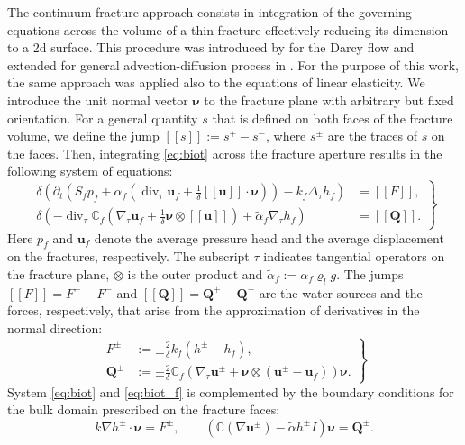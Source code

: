 \documentclass{article}
\newcommand{\CC}{\mathbb C}
\renewcommand{\div}{\operatorname{div}}
\newcommand{\eq}[1]{\begin{equation}#1\end{equation}}
\newcommand{\jmp}[1]{[\![#1]\!]}
\newcommand{\uu}{\vc u}
\newcommand{\vc}[1]{\boldsymbol{#1}}
\begin{document}
The continuum-fracture approach consists in integration of the governing equations across the volume of a thin fracture effectively reducing its dimension to a 2d surface. This procedure was introduced by \cite{martin_modeling_2005} for the Darcy flow and extended for general advection-diffusion process in \cite{brezina_analysis_2015}. For the purpose of this work, the same approach was applied also to the equations of linear elasticity. We introduce the unit normal vector $\vc\nu$ to the fracture plane with arbitrary but fixed orientation.
For a general quantity $s$ that is defined on both faces of the fracture volume, we define the jump $\jmp{s}:=s^+-s^-$, where $s^\pm$ are the traces of $s$ on the faces. 
Then, integrating \eqref{eq:biot} across the fracture aperture results in the following system of equations:
\eq{\label{eq:biot_f}\left.\begin{aligned}
\delta\left(\partial_t\left(S_fp_f + \alpha_f\left(\div_\tau\uu_f+\tfrac1\delta\jmp{\uu}\cdot\vc\nu\right)\right) - k_f\Delta_\tau h_f\right) &= \jmp{F}, \\
\delta\left(-\div_\tau\CC_f(\nabla_\tau\uu_f+\tfrac1\delta\vc\nu\otimes\jmp{\uu}) + \tilde\alpha_f\nabla_\tau h_f\right) &= \jmp{\vc Q}.
\end{aligned}\right\} }
Here $p_f$ and $\uu_f$ denote the average pressure head and the average displacement on the fractures, respectively. The subscript $\tau$ indicates tangential operators on the fracture plane, $\otimes$ is the outer product and $\tilde\alpha_f:=\alpha_f\varrho_l g$.
The jumps $\jmp{F}=F^+-F^-$ and $\jmp{\vc Q}=\vc Q^+-\vc Q^-$ are the water sources and the forces, respectively,  that arise from the approximation of derivatives in the normal direction:
\eq{ 
\label{eq:fr_coupling}
\left.\begin{aligned}
F^\pm &:= \pm\frac2\delta k_f(h^\pm-h_f),\\
\vc Q^\pm &:= \pm\frac2\delta\CC_f(\nabla_\tau\uu^\pm + \vc\nu\otimes(\uu^\pm-\uu_f))\vc\nu. %
\end{aligned}\right\} 
}
System \eqref{eq:biot} and \eqref{eq:biot_f} is complemented by the boundary conditions for the bulk domain prescribed on the fracture faces:
\eq{ 
\label{eq:fr_coupling_bulk}
k\nabla h^\pm\cdot\vc\nu = F^\pm,\qquad \left(\CC(\nabla\uu^\pm) - \tilde\alpha h^\pm I\right)\vc\nu = \vc Q^\pm. 
}
\end{document}

